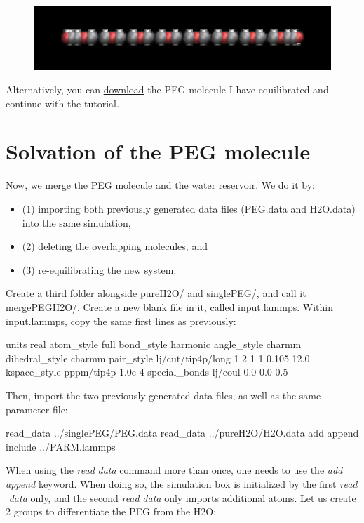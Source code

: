 \begin{figure}
\includegraphics[width=\linewidth]{tutorials/level2/polymer-in-water/singlePEG-light.png}
\end{figure}

Alternatively, you can \href{../../../../../inputs/level2/polymer-in-water/singlePEG/PEG.data}{download}
the PEG molecule I have equilibrated and continue with the tutorial.

\section{Solvation of the PEG molecule}

\noindent Now, we merge the PEG molecule and the
water reservoir. We do it by:
\begin{itemize}
\item (1) importing both previously generated data files (PEG.data and H2O.data) into the same simulation,
\item (2) deleting the overlapping molecules, and 
\item (3) re-equilibrating the new system. 
\end{itemize}
Create a third folder alongside pureH2O/ and singlePEG/,
and call it mergePEGH2O/. Create a new blank file in it,
called input.lammps. Within input.lammps, copy the same first lines as
previously:

\begin{lcverbatim}
units real
atom_style full
bond_style harmonic
angle_style charmm
dihedral_style charmm
pair_style lj/cut/tip4p/long 1 2 1 1 0.105 12.0
kspace_style pppm/tip4p 1.0e-4
special_bonds lj/coul 0.0 0.0 0.5
\end{lcverbatim}

\noindent Then, import the two previously generated data files, as well as the same parameter file:

\begin{lcverbatim}
read_data ../singlePEG/PEG.data
read_data ../pureH2O/H2O.data add append
include ../PARM.lammps
\end{lcverbatim}

\noindent When using the \textit{read$\_$data} command more than once, one needs
to use the \textit{add append} keyword. When doing so, the
simulation box is initialized by the first \textit{read$\_$data} only, and the 
second \textit{read$\_$data} only imports additional atoms.
Let us create 2 groups to differentiate the PEG from the H2O:


